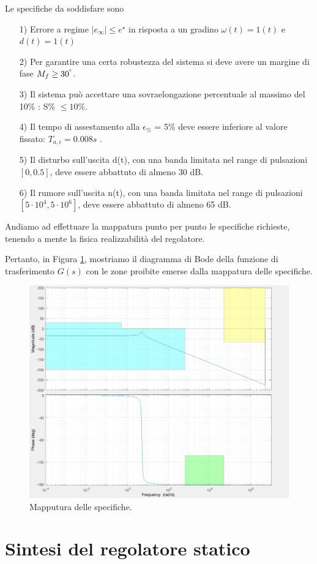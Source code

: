 \documentclass[a4paper, 11pt]{article}
\begin{document}
Le specifiche da soddisfare sono
\begin{itemize}
	\item[1)] Errore a regime $|e_{\infty}| \leq e^{\star}$ in risposta a un gradino $\omega (t) = 1(t)$ e $d(t)=1(t)$
	\item[2)] Per garantire una certa robustezza del sistema si deve avere un margine di fase $M_f \geq 30^{\degree}$.
	\item[3)] Il sistema può accettare una sovraelongazione percentuale al massimo del 10\% : S\% $\leq 10\%$.
	\item[4)] Il tempo di assestamento alla $\epsilon_{\%}$ = 5\% deve essere inferiore al valore fissato: $T_{a, \epsilon} = 0.008s$ .
	\item[5)] Il disturbo sull'uscita d(t), con una banda limitata nel range di pulsazioni $[0, 0.5]$, deve essere abbattuto di almeno 30 dB.
	\item[6)] Il rumore sull'uscita n(t), con una banda limitata nel range di pulsazioni $[5 \cdot 10^4, 5 \cdot 10^6]$, deve essere abbattuto di almeno 65 dB.
\end{itemize}
%
Andiamo ad effettuare la mappatura punto per punto le specifiche richieste, tenendo a mente la fisica realizzabilità del regolatore.  

Pertanto, in Figura \ref{fig:G_bode_specifiche}, mostriamo il diagramma di Bode della funzione di trasferimento $G(s)$ con le zone proibite emerse dalla mappatura delle specifiche.
\begin{figure}[h!]
	\centering
	\includegraphics[width=0.75\linewidth]{./images/bode_G_mappatura.png}
	\caption{Mapputura delle specifiche.}
	\label{fig:G_bode_specifiche}
\end{figure}

\section{Sintesi del regolatore statico}
\label{sec:static_regulator}
\end{document}

